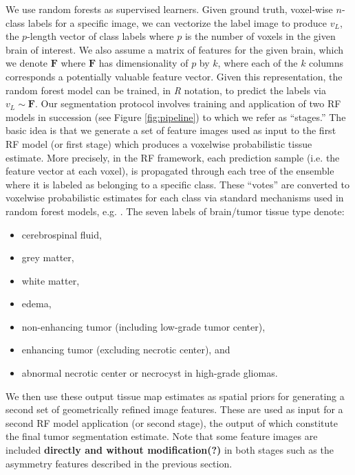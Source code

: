 \documentclass[preprint,authoryear,review,12pt]{elsarticle}
\begin{document}
We use random forests as supervised learners.  Given ground truth,
voxel-wise $n$-class labels for a specific image, we can vectorize the
label image to produce $v_L$, the $p$-length vector of class labels
where $p$ is the number of voxels in the given brain of interest.
We also assume a matrix of features for the given brain, which we
denote $\bm{F}$ where $\bm{F}$ has dimensionality of $p$ by
$k$, where each of the $k$ columns corresponds a potentially valuable
feature vector.  Given this representation, the random forest model
can be trained, in \textit{R} notation, to predict the labels via
$v_L \sim  \bm{F}$.
Our segmentation protocol involves training and application
of two RF models in succession 
(see Figure \ref{fig:pipeline}) to which we refer as ``stages.''  The basic idea is that
we generate a set of feature images used as input to the
first RF model (or first stage) which produces a voxelwise 
probabilistic tissue estimate.  More precisely, in the RF framework, each prediction sample (i.e. the feature vector at each voxel),
is propagated through each tree of the ensemble where it is labeled as belonging to a specific
class.  
These ``votes'' are converted to voxelwise probabilistic
estimates for each class via standard mechanisms used in random forest
models, e.g. \cite{liaw2002}.
The seven labels of brain/tumor tissue type denote:
\begin{itemize}
\item cerebrospinal fluid,
\item grey matter,
\item white matter,
\item edema, 
\item non-enhancing tumor (including low-grade tumor center), 
\item enhancing tumor (excluding necrotic center), and 
\item abnormal necrotic center or necrocyst in high-grade gliomas.
\end{itemize}
We then use these output tissue map estimates as spatial 
priors for generating a second set of geometrically refined image features.  These
are used as input for a second RF model application (or
second stage),
the output of which constitute the final tumor segmentation estimate.
Note that some feature images are included \textbf{directly and
  without modification(?)} in both stages such as
the asymmetry features described in the previous section.
\end{document}
